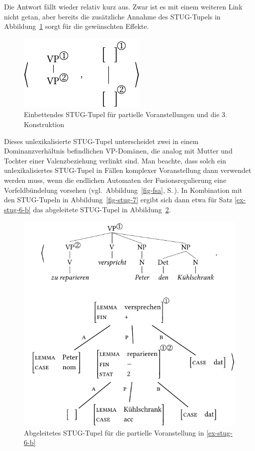 Die Antwort fällt wieder relativ kurz aus. Zwar ist es mit einem weiteren Link nicht getan, aber bereits die zusätzliche Annahme des STUG-Tupels in Abbildung~\ref{fig-stug-9} sorgt für die gewünschten Effekte.
\begin{figure}[t]
\centering
\includegraphics{graphics/abb911.pdf}
\caption{\label{fig-stug-9}Einbettendes STUG-Tupel für partielle Voranstellungen und die 3. Konstruktion}
\end{figure}
Dieses unlexikalisierte STUG-Tupel unterscheidet zwei in einem Dominanzverhältnis befindlichen VP-Domänen, die analog mit Mutter und Tochter einer Valenzbeziehung verlinkt sind. Man beachte, dass solch ein unlexikalisiertes STUG-Tupel in Fällen komplexer Voranstellung dann verwendet werden muss, wenn die endlichen Automaten der Fusionsregulierung eine Vorfeldbündelung vorsehen (vgl.\ Abbildung~\ref{fig-fsa}, S.\,\pageref{fig-fsa}). In Kombination mit den STUG-Tupeln in Abbildung~\ref{fig-stug-7} ergibt sich dann etwa für Satz \ref{ex-stug-6-b} das abgeleitete STUG-Tupel in Abbildung~\ref{fig-stug-10}.
\begin{figure}[t]
\centering
\includegraphics{graphics/abb912.pdf}
\caption{\label{fig-stug-10} Abgeleitetes STUG-Tupel für die partielle Voranstellung in \ref{ex-stug-6-b}}
\end{figure}
